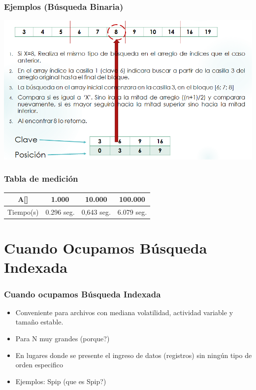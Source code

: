 \documentclass[hyperref={pdfpagelabels=false}]{beamer}
\begin{document}
\begin{frame}
\frametitle{Ejemplos (B\'usqueda Binaria)}
\includegraphics[width=1.0\textwidth]{busqBin.png}
\end{frame}

\begin{frame}
\frametitle{Tabla de medici\'on}
\begin{tabular}{|c|c|c|c|}
\hline
\textbf{A[]} & \textbf{1.000} & \textbf{10.000} & \textbf{100.000} \\
\hline Tiempo(s)& 0.296 seg.&0,643 seg.& 6.079 seg.\\ \hline
\end{tabular}
\end{frame}

\section{Cuando Ocupamos B\'usqueda Indexada}
\begin{frame}
\frametitle{Cuando ocupamos B\'usqueda Indexada}
\begin{itemize}
\item Conveniente para archivos con mediana volatilidad, actividad variable y tama\~no estable.
\item Para N muy grandes (porque?)
\item En lugares donde se presente el ingreso de datos (registros) sin ning\'un tipo de orden especifico
\item Ejemplos: Spip (que es Spip?)
\end{itemize}
\end{frame}
\end{document}
